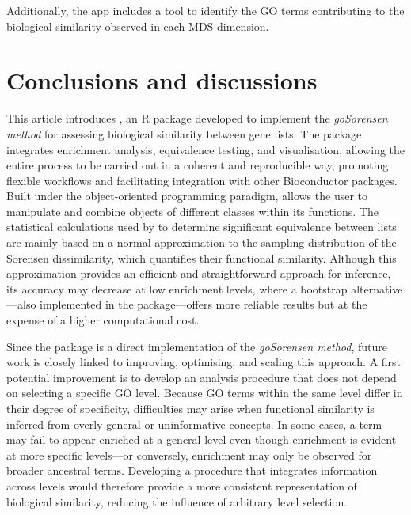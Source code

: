 Additionally, the app includes a tool to identify the GO terms contributing to the biological similarity observed in each MDS dimension.

\section{Conclusions and discussions}\label{conclusions-and-discussions}

This article introduces , an R package developed to implement the \emph{goSorensen method} for assessing biological similarity between gene lists. The package integrates enrichment analysis, equivalence testing, and visualisation, allowing the entire process to be carried out in a coherent and reproducible way, promoting flexible workflows and facilitating integration with other Bioconductor packages. Built under the object-oriented programming paradigm,  allows the user to manipulate and combine objects of different classes within its functions. The statistical calculations used by  to determine significant equivalence between lists are mainly based on a normal approximation to the sampling distribution of the Sorensen dissimilarity, which quantifies their functional similarity. Although this approximation provides an efficient and straightforward approach for inference, its accuracy may decrease at low enrichment levels, where a bootstrap alternative---also implemented in the package---offers more reliable results but at the expense of a higher computational cost.

Since the  package is a direct implementation of the \emph{goSorensen method}, future work is closely linked to improving, optimising, and scaling this approach. A first potential improvement is to develop an analysis procedure that does not depend on selecting a specific GO level. Because GO terms within the same level differ in their degree of specificity, difficulties may arise when functional similarity is inferred from overly general or uninformative concepts. In some cases, a term may fail to appear enriched at a general level even though enrichment is evident at more specific levels---or conversely, enrichment may only be observed for broader ancestral terms. Developing a procedure that integrates information across levels would therefore provide a more consistent representation of biological similarity, reducing the influence of arbitrary level selection.

